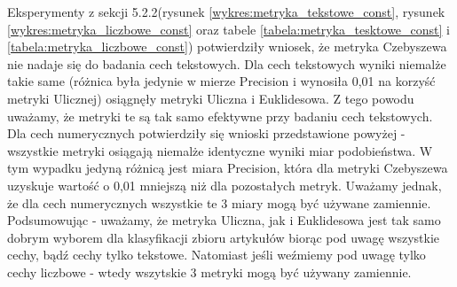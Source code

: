 \documentclass{classrep}
\begin{document}
\indent Eksperymenty z sekcji 5.2.2(rysunek \ref{wykres:metryka_tekstowe_const}, rysunek \ref{wykres:metryka_liczbowe_const} oraz tabele \ref{tabela:metryka_tesktowe_const} i \ref{tabela:metryka_liczbowe_const}) potwierdziły wniosek, że metryka Czebyszewa nie nadaje się do badania cech tekstowych. Dla cech tekstowych wyniki niemalże takie same (różnica była jedynie w mierze Precision i wynosiła 0,01 na korzyść metryki Ulicznej) osiągnęły metryki Uliczna i Euklidesowa. Z tego powodu uważamy, że metryki te są tak samo efektywne przy badaniu cech tekstowych. Dla cech numerycznych potwierdziły się wnioski przedstawione powyżej - wszystkie metryki osiągają niemalże identyczne wyniki miar podobieństwa. W tym wypadku jedyną różnicą jest miara Precision, która dla metryki Czebyszewa uzyskuje wartość o 0,01 mniejszą niż dla pozostałych metryk. Uważamy jednak, że dla cech numerycznych wszystkie te 3 miary mogą być używane zamiennie. Podsumowując - uważamy, że metryka Uliczna, jak i Euklidesowa jest tak samo dobrym wyborem dla klasyfikacji zbioru artykułów biorąc pod uwagę wszystkie cechy, bądź cechy tylko tekstowe. Natomiast jeśli weźmiemy pod uwagę tylko cechy liczbowe - wtedy wszytskie 3 metryki mogą być używany zamiennie.
\end{document}
